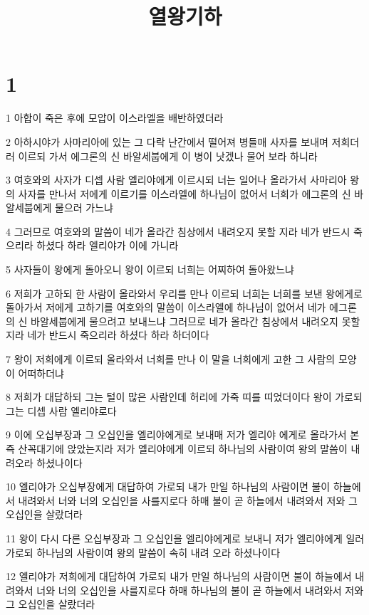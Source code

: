 

\title{열왕기하}


\chapter{1}

\par 1 아합이 죽은 후에 모압이 이스라엘을 배반하였더라
\par 2 아하시야가 사마리아에 있는 그 다락 난간에서 떨어져 병들매 사자를 보내며 저희더러 이르되 가서 에그론의 신 바알세붑에게 이 병이 낫겠나 물어 보라 하니라
\par 3 여호와의 사자가 디셉 사람 엘리야에게 이르시되 너는 일어나 올라가서 사마리아 왕의 사자를 만나서 저에게 이르기를 이스라엘에 하나님이 없어서 너희가 에그론의 신 바알세붑에게 물으러 가느냐
\par 4 그러므로 여호와의 말씀이 네가 올라간 침상에서 내려오지 못할 지라 네가 반드시 죽으리라 하셨다 하라 엘리야가 이에 가니라
\par 5 사자들이 왕에게 돌아오니 왕이 이르되 너희는 어찌하여 돌아왔느냐
\par 6 저희가 고하되 한 사람이 올라와서 우리를 만나 이르되 너희는 너희를 보낸 왕에게로 돌아가서 저에게 고하기를 여호와의 말씀이 이스라엘에 하나님이 없어서 네가 에그론의 신 바알세붑에게 물으려고 보내느냐 그러므로 네가 올라간 침상에서 내려오지 못할지라 네가 반드시 죽으리라 하셨다 하라 하더이다
\par 7 왕이 저희에게 이르되 올라와서 너희를 만나 이 말을 너희에게 고한 그 사람의 모양이 어떠하더냐
\par 8 저희가 대답하되 그는 털이 많은 사람인데 허리에 가죽 띠를 띠었더이다 왕이 가로되 그는 디셉 사람 엘리야로다
\par 9 이에 오십부장과 그 오십인을 엘리야에게로 보내매 저가 엘리야 에게로 올라가서 본즉 산꼭대기에 앉았는지라 저가 엘리야에게 이르되 하나님의 사람이여 왕의 말씀이 내려오라 하셨나이다
\par 10 엘리야가 오십부장에게 대답하여 가로되 내가 만일 하나님의 사람이면 불이 하늘에서 내려와서 너와 너의 오십인을 사를지로다 하매 불이 곧 하늘에서 내려와서 저와 그 오십인을 살랐더라
\par 11 왕이 다시 다른 오십부장과 그 오십인을 엘리야에게로 보내니 저가 엘리야에게 일러 가로되 하나님의 사람이여 왕의 말씀이 속히 내려 오라 하셨나이다
\par 12 엘리야가 저희에게 대답하여 가로되 내가 만일 하나님의 사람이면 불이 하늘에서 내려와서 너와 너의 오십인을 사를지로다 하매 하나님의 불이 곧 하늘에서 내려와서 저와 그 오십인을 살랐더라
